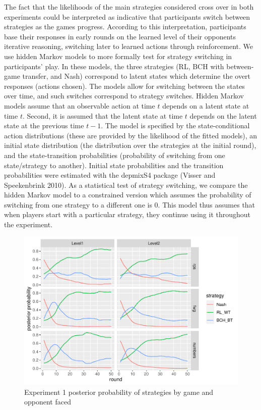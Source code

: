 \documentclass[smallextended]{svjour3}       %
\begin{document}
The fact that the likelihoods of the main strategies considered cross
over in both experiments could be interpreted as indicative that
participants switch between strategies as the games progress. According
to this interpretation, participants base their responses in early
rounds on the learned level of their opponents iterative reasoning,
switching later to learned actions through reinforcement. We use hidden
Markov models to more formally test for strategy switching in
participants' play. In these models, the three strategies (RL, BCH with
between-game transfer, and Nash) correspond to latent states which
determine the overt responses (actions chosen). The models allow for
switching between the states over time, and such switches correspond to
strategy switches. Hidden Markov models assume that an observable action
at time \(t\) depends on a latent state at time \(t\). Second, it is
assumed that the latent state at time \(t\) depends on the latent state
at the previous time \(t-1\). The model is specified by the
state-conditional action distributions (these are provided by the
likelihood of the fitted models), an initial state distribution (the
distribution over the strategies at the initial round), and the
state-transition probabilities (probability of switching from one
state/strategy to another). Initial state probabilities and the
transition probabilities were estimated with the depmixS4 package
(Visser and Speekenbrink 2010). As a statistical test of strategy
switching, we compare the hidden Markov model to a constrained version
which assumes the probability of switching from one strategy to a
different one is 0. This model thus assumes that when players start with
a particular strategy, they continue using it throughout the experiment.

\begin{figure}

{\centering \includegraphics[width=\textwidth]{CBB_v2_files/figure-latex/exp1-posteriors-plot-1} 

}

\caption{Experiment 1 posterior probability of strategies by game and opponent faced}\label{fig:exp1-posteriors-plot}
\end{figure}
\end{document}
